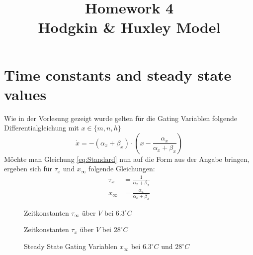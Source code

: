 \documentclass[conference]{IEEEtran}
\begin{document}
%
%
\title{Homework 4\\ Hodgkin \& Huxley Model}

\author{
}


\maketitle

\IEEEpeerreviewmaketitle

\section{Time constants and steady state values}
Wie in der Vorlesung gezeigt wurde gelten für die Gating Variablen folgende Differentialgleichung mit $x \in \{m,n,h\}$
\begin{equation}
	\dot{x} = -(\alpha_x + \beta_x) \cdot \left(x - \frac{\alpha_x}{\alpha_x + \beta_x}\right)
	\label{eq:Standard}
\end{equation}
Möchte man Gleichung \eqref{eq:Standard} nun auf die Form aus der Angabe bringen, ergeben sich für $\tau_x$ und $x_{\infty}$ folgende Gleichungen:
\begin{align}
	\tau_x & = \frac{1}{\alpha_x + \beta_x}\\
	x_{\infty} & = \frac{\alpha_x}{\alpha_x + \beta_x}
\end{align}

\begin{figure}[h!]
  	\centering
    \scalebox{.6}{}
    \caption{Zeitkonstanten $\tau_\infty$ über $V$ bei $6.3^\circ C$}
    \label{fig:Zeitkonstanten6}
\end{figure}

\begin{figure}[h!]
  	\centering
    \scalebox{.6}{}
    \caption{Zeitkonstanten $\tau_x$ über $V$ bei $28^\circ C$}
    \label{fig:Zeitkonstanten28}
\end{figure}

\begin{figure}[h!]
  	\centering
    \scalebox{.6}{}
    \caption{Steady State Gating Variablen $x_\infty$ bei $6.3^\circ C$ und $28^\circ C$}
    \label{fig:Gating1}
\end{figure}
\end{document}
